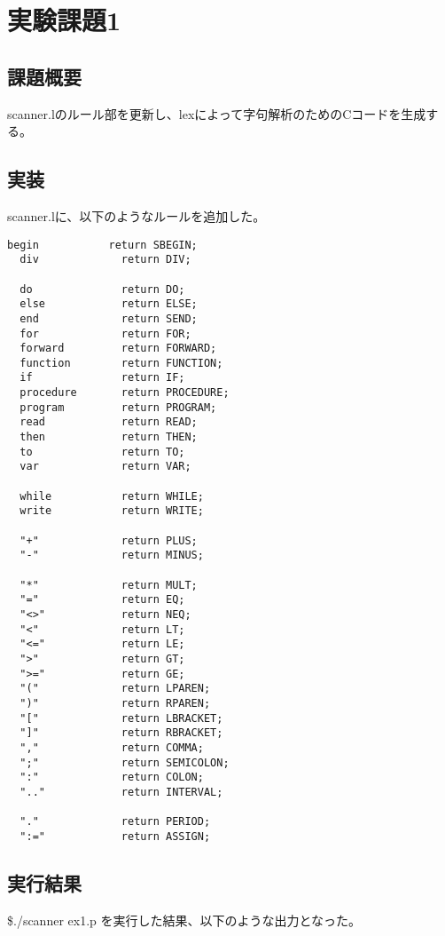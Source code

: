 \section{実験課題1}
\subsection{課題概要}
scanner.lのルール部を更新し、lexによって字句解析のためのCコードを生成する。

\subsection{実装}
scanner.lに、以下のようなルールを追加した。

\begin{lstlisting}[caption={scanner.l(ルールの記述)},label={scanner.l(ルールの記述)}]
  begin           return SBEGIN;
  div             return DIV;
  
  do              return DO;
  else            return ELSE;
  end             return SEND;
  for             return FOR;
  forward         return FORWARD;
  function        return FUNCTION;
  if              return IF;
  procedure       return PROCEDURE;
  program         return PROGRAM;
  read            return READ;
  then            return THEN;
  to              return TO;
  var             return VAR;
  
  while           return WHILE;
  write           return WRITE;
  
  "+"             return PLUS;
  "-"             return MINUS;
  
  "*"             return MULT;
  "="             return EQ;
  "<>"            return NEQ;
  "<"             return LT;
  "<="            return LE;
  ">"             return GT;
  ">="            return GE;
  "("             return LPAREN;
  ")"             return RPAREN;
  "["             return LBRACKET;
  "]"             return RBRACKET;
  ","             return COMMA;
  ";"             return SEMICOLON;
  ":"             return COLON;
  ".."            return INTERVAL;
  
  "."             return PERIOD;
  ":="            return ASSIGN;
\end{lstlisting}

\subsection{実行結果}
\$./scanner ex1.p を実行した結果、以下のような出力となった。

